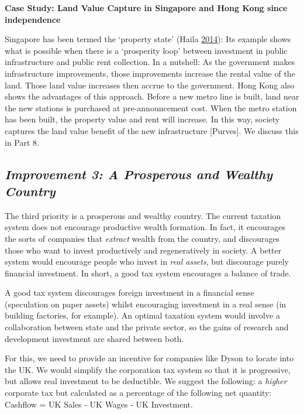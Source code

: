 \documentclass[]{tufte-handout}
\begin{document}
\textbf{Case Study: Land Value Capture in Singapore and Hong Kong since
independence}

Singapore has been termed the `property state' (Haila
\protect\hyperlink{ref-Haila2015}{2014}): Its example shows what is
possible when there is a `prosperity loop' between investment in public
infrastructure and public rent collection. In a nutshell: As the
government makes infrastructure improvements, those improvements
increase the rental value of the land. Those land value increases then
accrue to the government. Hong Kong also shows the advantages of this
approach. Before a new metro line is built, land near the new stations
is purchased at pre-announcement cost. When the metro station has been
built, the property value and rent will increase. In this way, society
captures the land value benefit of the new infrastructure {[}Purves{]}.
We discuss this in Part 8.

\hypertarget{improvement-3-a-prosperous-and-wealthy-country}{%
\subsection{\texorpdfstring{\emph{Improvement 3: A Prosperous and
Wealthy
Country}}{Improvement 3: A Prosperous and Wealthy Country}}\label{improvement-3-a-prosperous-and-wealthy-country}}

The third priority is a prosperous and wealthy country. The current
taxation system does not encourage productive wealth formation. In fact,
it encourages the sorts of companies that \emph{extract} wealth from the
country, and discourages those who want to invest productively and
regeneratively in society. A better system would encourage people who
invest in \emph{real assets}, but discourage purely financial
investment. In short, a good tax system encourages a balance of trade.

A good tax system discourages foreign investment in a financial sense
(speculation on paper assets) whilst encouraging investment in a real
sense (in building factories, for example). An optimal taxation system
would involve a collaboration between state and the private sector, so
the gains of research and development investment are shared between
both.

For this, we need to provide an incentive for companies like Dyson to
locate into the UK. We would simplify the corporation tax system so that
it is progressive, but allows real investment to be deductible. We
suggest the following: a \emph{higher} corporate tax but calculated as a
percentage of the following net quantity: Cashflow = UK Sales - UK Wages
- UK Investment.
\end{document}
